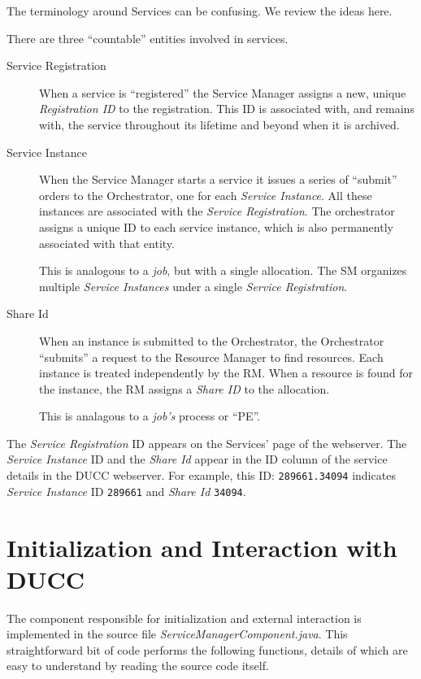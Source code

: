    The terminology around Services can be confusing.  We review the ideas here.

   There are three ``countable'' entities involved in services.  
   \begin{description}
     \item[Service Registration] When a service is ``registered'' the Service Manager assigns
       a new, unique {\em Registration ID} to the registration.  This ID is associated with, and
       remains with, the service throughout its lifetime and beyond when it is archived.

     \item[Service Instance] When the Service Manager starts a service it issues a series of
       ``submit'' orders to the Orchestrator, one for each {\em Service Instance}.  All these 
       instances are associated with the {\em Service Registration}.  The orchestrator assigns
       a unique ID to each service instance, which is also permanently associated with that entity.
       
       This is analogous to a {\em job}, but with a single allocation.  The SM organizes
       multiple {\em Service Instances} under a single {\em Service Registration}.
       
     \item[Share Id] When an instance is submitted to the Orchestrator, the Orchestrator
       ``submits'' a request to the Resource Manager to find resources.  Each instance is
       treated independently by the RM.  When a resource is found for the instance, the RM
       assigns a {\em Share ID} to the allocation. 
       
       This is analagous to a {\em job's} process or ``PE''.
    \end{description}

    The {\em Service Registration} ID appears on the Services' page of the webserver.  The {\em
      Service Instance} ID and the {\em Share Id} appear in the ID column of the service details in
    the DUCC webserver.  For example, this ID: {\tt 289661.34094} indicates {\em Service Instance}
    ID {\tt 289661} and {\em Share Id} {\tt 34094}.

\section{Initialization and Interaction with DUCC}
   The component responsible for initialization and external interaction is
   implemented in the source file {\em ServiceManagerComponent.java}.  This
   straightforward bit of code performs the following functions, details of which
   are easy to understand by reading the source code itself.  

